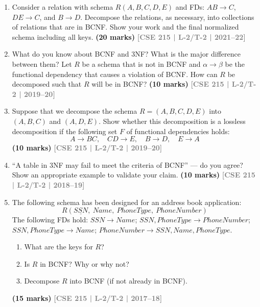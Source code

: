 \documentclass[12pt,a3paper]{article}
\newcommand{\yr}[1]{\hfill\textcolor{gray}{\small\textbf{[#1]}}}
\newcommand{\mk}[1]{\textcolor{orange!70!black}{\small\textbf{(#1 marks)}}}
\begin{document}
\begin{enumerate}
\item Consider a relation with schema $R(A, B, C, D, E)$ and FDs: $AB \to C$, $DE \to C$, and $B \to D$. Decompose the relations, as necessary, into collections of relations that are in BCNF. Show your work and the final normalized schema including all keys.
\mk{20} \yr{CSE 215 | L-2/T-2 | 2021--22}



\item What do you know about BCNF and 3NF? What is the major difference between them? Let $R$ be a schema that is not in BCNF and $\alpha \to \beta$ be the functional dependency that causes a violation of BCNF. How can $R$ be decomposed such that $R$ will be in BCNF?
\mk{10} \yr{CSE 215 | L-2/T-2 | 2019--20}

\item Suppose that we decompose the schema $R = (A, B, C, D, E)$ into $(A, B, C)$ and $(A, D, E)$. Show whether this decomposition is a lossless decomposition if the following set $F$ of functional dependencies holds:
\[A \to BC,\quad CD \to E,\quad B \to D,\quad E \to A\]
\mk{10} \yr{CSE 215 | L-2/T-2 | 2019--20}


\item ``A table in 3NF may fail to meet the criteria of BCNF'' --- do you agree? Show an appropriate example to validate your claim.
\mk{10} \yr{CSE 215 | L-2/T-2 | 2018--19}

\item The following schema has been designed for an address book application:
\[R(\underline{SSN},\ Name,\ PhoneType,\ PhoneNumber)\]
The following FDs hold: $SSN \to Name$;\; $SSN, PhoneType \to PhoneNumber$;\; $SSN, PhoneType \to Name$;\; $PhoneNumber \to SSN, Name, PhoneType$.
\begin{enumerate}
  \item What are the keys for $R$?
  \item Is $R$ in BCNF? Why or why not?
  \item Decompose $R$ into BCNF (if not already in BCNF).
\end{enumerate}
\mk{15} \yr{CSE 215 | L-2/T-2 | 2017--18}


\end{enumerate}
\end{document}

